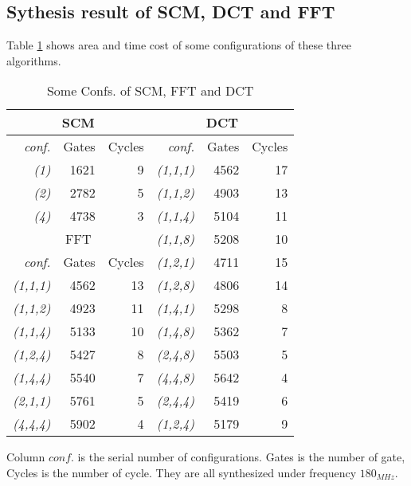 \subsection{Sythesis result of SCM, DCT and FFT}
Table \ref{table:confs} shows area and time cost of some configurations of these three algorithms.
\begin{table}[hb]
\centering
\caption{Some Confs. of SCM, FFT and DCT}
\begin{tabular}{|r|rr|r|rr|} \hline
\multicolumn{3}{|c|}{SCM} & \multicolumn{3}{c|}{DCT} \\ \hline
\textit{conf.} & Gates & Cycles & \textit{conf.} & Gates & Cycles \\ \hline
\textit{(1)} & 1621 & 9 & \textit{(1,1,1)} & 4562 & 17 \\
\textit{(2)} & 2782 & 5 & \textit{(1,1,2)} & 4903 & 13 \\
\textit{(4)} & 4738 & 3 & \textit{(1,1,4)} & 5104 & 11 \\ \cline{1-3}
\multicolumn{3}{|c|}{FFT} & \textit{(1,1,8)} & 5208 & 10 \\ \cline{1-3}
\textit{conf.} & Gates & Cycles & \textit{(1,2,1)} & 4711 & 15 \\ \cline{1-3}
\textit{(1,1,1)} & 4562 & 13 & \textit{(1,2,8)} & 4806 & 14 \\
\textit{(1,1,2)} & 4923 & 11 & \textit{(1,4,1)} & 5298 & 8 \\
\textit{(1,1,4)} & 5133 & 10 & \textit{(1,4,8)} & 5362 & 7 \\
\textit{(1,2,4)} & 5427 & 8 & \textit{(2,4,8)} & 5503 & 5 \\
\textit{(1,4,4)} & 5540 & 7 & \textit{(4,4,8)} & 5642 & 4 \\
\textit{(2,1,1)} & 5761 & 5 & \textit{(2,4,4)} & 5419 & 6 \\
\textit{(4,4,4)} & 5902 & 4 & \textit{(1,2,4)} & 5179 & 9 \\ \hline
\end{tabular}
\label{table:confs}
\end{table}
Column $conf.$ is the serial number of configurations. Gates is the number of gate, Cycles is the number of cycle. They are all synthesized under frequency $180_{MHz}$.
